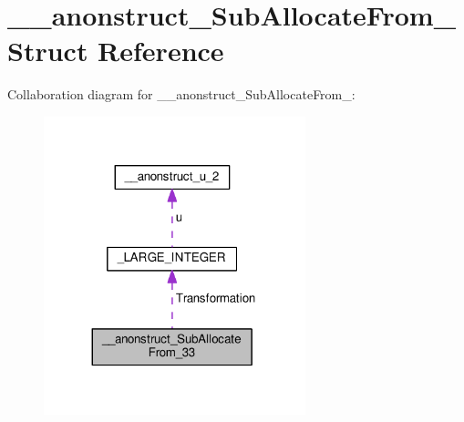 \hypertarget{struct____anonstruct__SubAllocateFrom__33}{}\section{\+\_\+\+\_\+anonstruct\+\_\+\+Sub\+Allocate\+From\+\_ Struct Reference}
\label{struct____anonstruct__SubAllocateFrom__33}


Collaboration diagram for \+\_\+\+\_\+anonstruct\+\_\+\+Sub\+Allocate\+From\+\_\+:
\nopagebreak
\begin{figure}[H]
\begin{center}
\leavevmode
\includegraphics[width=215pt]{struct____anonstruct__SubAllocateFrom__33__coll__graph}
\end{center}
\end{figure}
